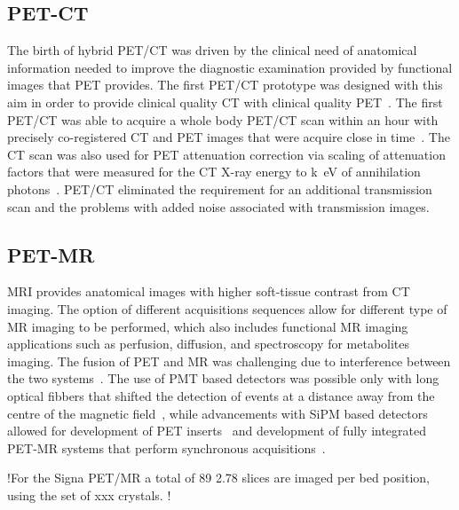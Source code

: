 \subsection{PET-CT}
The birth of hybrid PET/CT was driven by the clinical need of anatomical information needed to improve the diagnostic examination provided by functional images that PET provides. The first PET/CT prototype was designed with this aim in order to provide clinical quality CT with clinical quality PET~\cite{Townsend2008}. The first PET/CT was able to acquire a whole body PET/CT scan within an hour with precisely co-registered CT and PET images that were acquire close in time~\cite{Beyer2000}. The CT scan was also used for PET attenuation correction via scaling of attenuation factors that were measured for the CT X-ray energy to \si{k\electronvolt} of annihilation photons~\cite{Kinahan1998}. PET/CT eliminated the requirement for an additional transmission scan and the problems with added noise associated with transmission images. 

\subsection{PET-MR}
MRI provides anatomical images with higher soft-tissue contrast from CT imaging. The option of different acquisitions sequences allow for different type of MR imaging to be performed, which also includes functional MR imaging applications such as perfusion, diffusion, and spectroscopy for metabolites imaging. 
The fusion of PET and MR was challenging due to interference between the two systems~\cite{Disselhorst2014}. The use of PMT based detectors was possible only with long optical fibbers that shifted the detection of events at a distance away from the centre of the magnetic field~\cite{Shao1997,Mackewn2010}, while advancements with SiPM based detectors allowed for development of PET inserts~\cite{Kolb2012} and development of fully integrated PET-MR systems that perform synchronous acquisitions~\cite{Delso2011,Grant2016,Levin2016}.

!For the Signa PET/MR a total of 89 2.78 slices are imaged per bed position, using the set of xxx crystals. !

